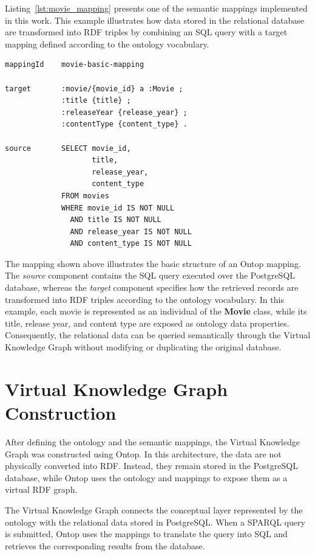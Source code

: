 Listing~\ref{lst:movie_mapping} presents one of the semantic mappings implemented in this work. This example illustrates how data stored in the relational database are transformed into RDF triples by combining an SQL query with a target mapping defined according to the ontology vocabulary.
\begin{lstlisting}[caption={Example of the movie-basic-mapping implemented in Ontop},label={lst:movie_mapping}]
mappingId    movie-basic-mapping

target       :movie/{movie_id} a :Movie ;
             :title {title} ;
             :releaseYear {release_year} ;
             :contentType {content_type} .

source       SELECT movie_id,
                    title,
                    release_year,
                    content_type
             FROM movies
             WHERE movie_id IS NOT NULL
               AND title IS NOT NULL
               AND release_year IS NOT NULL
               AND content_type IS NOT NULL
\end{lstlisting}

The mapping shown above illustrates the basic structure of an Ontop mapping. The \textit{source} component contains the SQL query executed over the PostgreSQL database, whereas the \textit{target} component specifies how the retrieved records are transformed into RDF triples according to the ontology vocabulary. In this example, each movie is represented as an individual of the \textbf{Movie} class, while its title, release year, and content type are exposed as ontology data properties. Consequently, the relational data can be queried semantically through the Virtual Knowledge Graph without modifying or duplicating the original database.

\section{Virtual Knowledge Graph Construction}

After defining the ontology and the semantic mappings, the Virtual Knowledge Graph was constructed using Ontop. In this architecture, the data are not physically converted into RDF. Instead, they remain stored in the PostgreSQL database, while Ontop uses the ontology and mappings to expose them as a virtual RDF graph.

The Virtual Knowledge Graph connects the conceptual layer represented by the ontology with the relational data stored in PostgreSQL. When a SPARQL query is submitted, Ontop uses the mappings to translate the query into SQL and retrieves the corresponding results from the database.

